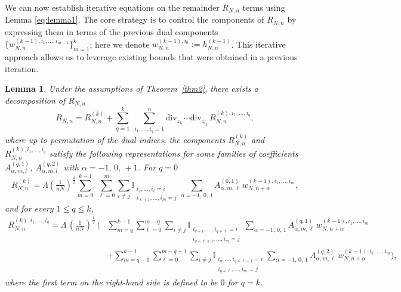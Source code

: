 \documentclass[pdflatex,sn-mathphys-num]{sn-jnl}
\theoremstyle{thmstyleone}%
\theoremstyle{thmstyletwo}%
\theoremstyle{thmstylethree}%
\newtheorem{lemma}{Lemma}
\begin{document}
We can now establish iterative equations on the remainder \(R_{N,n}\) terms using Lemma \ref{eq:lemma1}. The core strategy is to control the components of
\(R_{N,n}\) by expressing them in terms of the previous dual components \(\{w_{N,n}^{(k-1),i_1,...,i_{m-1}}\}_{m=1}^k\); here we denote \(w_{N,n}^{(k-1),i_0}:= h_{N,n}^{(k-1)}\). This iterative approach allows us to leverage existing 
bounds that were obtained in a previous iteration.
%
\begin{lemma}\label{lemma3}
Under the assumptions of Theorem~\ref{thm2}, there exists a decomposition of \(R_{N,n}\)
\begin{equation}\label{eq:Remainder_decomposition}
R_{N,n}
= R_{N,n}^{(k)}
+ \sum_{q=1}^k \;\sum_{i_1,\dots,i_q=1}^n
\mathrm{div}_{z_{i_1}}\cdots \mathrm{div}_{z_{i_q}}
\, R_{N,n}^{(k),i_1,\dots,i_q},
\end{equation}
where up to permutation of the dual indices,
the components \(R_{N,n}^{(k)}\) and \(R_{N,n}^{(k),i_1,\dots,i_q}\) satisfy the following
representations for some families of coefficients
$A_{\alpha,m,l}^{(q,1)}$, $A_{\alpha, m,l}^{(q,2)}$ with $\alpha=-1,\,0,\,+1$. For $q=0$
\[
R_{N,n}^{(k)}
= \Lambda\!\left(\tfrac{1}{nN}\right)^{\frac12}
\sum_{m=0}^{k-1} \;\sum_{\ell=0}^{m}\sum_{i\neq j} \mathbb{I}_{\substack{i_{1},\ldots, i_{\ell}=i \\ i_{\ell+1},\ldots,i_m=j}}\sum_{\alpha=-1,\,0,\,1}
A_{\alpha,m,\ell}^{(0,1)}\,
w_{N,n+\alpha}^{(k-1),i_1,\dots,i_{m}},
\]
and for every \(1\le q\le k\),
\[
\begin{aligned}
R_{N,n}^{(k),i_1,\dots,i_q}
= \Lambda\,\left(\tfrac{1}{nN}\right)^{\frac12}\,\Bigg(
&\sum_{m=q}^{k-1} \sum_{\ell=0}^{m-q}\sum_{i\neq j} \mathbb{I}_{\substack{i_{q+1},\ldots, i_{q+\ell}=i \\ i_{q+\ell+1},\ldots,i_m=j}}\,\sum_{\alpha=-1,\,0,\,1} 
A_{\alpha,m,\ell}^{(q,1)}\,
w_{N,n+\alpha}^{(k-1),i_1,\dots,i_{m}}\\
&+\sum_{m=q-1}^{k-1} \sum_{\ell=0}^{m-q+1}\sum_{i\neq j}
\mathbb{I}_{\substack{
i_{q},\ldots, i_{q+\ell-1}=i \\
i_{q+\ell},\ldots,i_m=j
}}
\sum_{\alpha=-1,\,0,\,1}
A_{\alpha,m,\ell}^{(q,2)}\,
w_{N,n+\alpha}^{(k-1),i_1,\dots,i_m}
\Bigg),
\end{aligned}
\]
where the first term on the right-hand side is defined to be \(0\) for \(q=k\).
\end{lemma}
\end{document}
